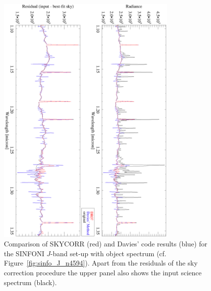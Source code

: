 \begin{figure}
\centering
\includegraphics[width=8.8cm,clip=true,angle=90]
{figures/N4594-SINFO-J_comp.eps}
\caption[]{Comparison of SKYCORR (red) and Davies' code results (blue) for the
SINFONI $J$-band set-up with object spectrum (cf.
Figure~\ref{fig:sinfo_J_n4594}). Apart from the residuals of the sky correction
procedure the upper panel also shows the input science spectrum (black).}
\label{fig:sinfo_J_n4594_comp}
\end{figure}


